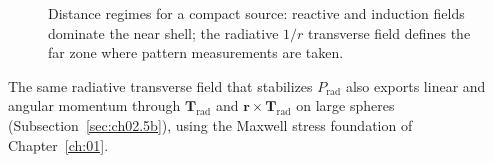 \begin{figure}[t]
\centering
{}
\caption{Distance regimes for a compact source: reactive and induction fields dominate the near shell; the radiative $1/r$ transverse field defines the far zone where pattern measurements are taken.}
\label{fig:ch2.distance-regimes}
\end{figure}

The same radiative transverse field that stabilizes $P_{\mathrm{rad}}$ also exports linear and angular momentum through $\mathbf{T}_{\mathrm{rad}}$ and $\mathbf{r}\times\mathbf{T}_{\mathrm{rad}}$ on large spheres (Subsection~\ref{sec:ch02.5b}), using the Maxwell stress foundation of Chapter~\ref{ch:01}.
